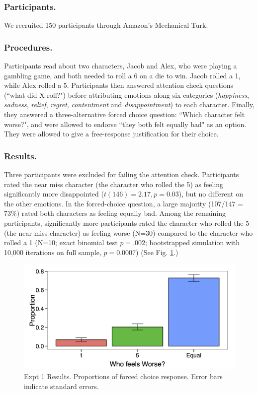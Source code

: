 \documentclass[10pt,letterpaper]{article}
\begin{document}
\subsubsection{Participants.} We recruited 150 participants through Amazon's Mechanical Turk.

\subsubsection{Procedures.} Participants read about two characters, Jacob and Alex, who were playing a gambling game, and both needed to roll a 6 on a die to win. Jacob rolled a 1, while Alex rolled a 5. Participants then answered attention check questions (``what did X roll?") before attributing emotions along six categories (\textit{happiness}, \textit{sadness}, \textit{relief}, \textit{regret}, \textit{contentment} and \textit{disappointment})  to each character. Finally, they answered a three-alternative forced choice question: ``Which character felt worse?", and were allowed to endorse ``they both felt equally bad" as an option. They were allowed to give a free-response justification for their choice.

\subsubsection{Results.} Three participants were excluded for failing the attention check. Participants rated the near miss character (the character who rolled the 5) as feeling significantly more disappointed ($t(146)=2.17, p=0.03$), but no different on the other emotions. In the forced-choice question, a large majority (107/147 = 73\%) rated both characters as feeling equally bad. Among the remaining participants, significantly more participants rated the character who rolled the 5 (the near miss character) as feeling worse (N=30) compared to the character who rolled a 1 (N=10; exact binomial test $p=.002$; bootstrapped simulation with 10,000 iterations on full sample, $p=0.0007$) (See Fig. \ref{Expt1ResultFig}.)

\begin{figure}[htb!]
\includegraphics[width=\columnwidth]{images/Expt1results.png}
\caption{ Expt 1 Results. Proportions of forced choice response. Error bars indicate standard errors. }
\label{Expt1ResultFig}
\end{figure}
\end{document}
